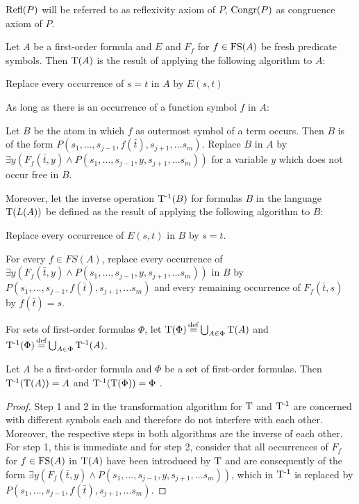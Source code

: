 $\operatorname{Refl}(P)$ will be referred to as reflexivity axiom of $P$, $\operatorname{Congr}(P)$ as congruence axiom of $P$.

\begin{defi}
	\label{def:trans}
	Let $A$ be a first-order formula and $E$ and $F_f$ for $f \in \operatorname{FS}(A)$ be fresh predicate symbols.
	Then $\operatorname{T}(A)$ is the result of applying the following algorithm to $A$:

	\begin{compactenum}
	\item Replace every occurrence of $s=t$ in $A$ by $E(s, t)$
	\label{def:trans_step1}
	\item As long as there is an occurrence of a function symbol $f$ in $A$:
	\label{def:trans_step2}

		Let $B$ be the atom in which $f$ as outermost symbol of a term occurs.
		Then $B$ is of the form $P(s_1, \ldots, s_{j-1}, f(\bar t),\allowbreak s_{j+1}, \ldots s_m)$.
		Replace $B$ in $A$ by $\exists y (F_f(\bar t, y) \land P(s_1, \ldots, s_{j-1}, y, s_{j+1}, \ldots s_m))$ for a variable $y$ which does not occur free in $B$.
	\end{compactenum}

	Moreover, let the inverse operation $\operatorname{T^{-1}}(B)$ for formulas $B$ in the language $\operatorname{T}(L(A))$ be defined as the result of applying the following algorithm to $B$:
	\begin{compactenum}
	\item Replace every occurrence of $E(s, t)$ in $B$ by $s=t$.
	\item For every $f \in FS(A)$, replace every occurrence of 
		$\exists y (F_f(\bar t, y) \land P(s_1, \ldots, s_{j-1},\allowbreak y,\allowbreak s_{j+1}, \ldots s_m))$
		in $B$ by $P(s_1, \ldots, s_{j-1},\allowbreak f(\bar t),\allowbreak s_{j+1}, \ldots s_m)$ and every remaining occurrence of $F_f(\bar t, s)$ by $f(\bar t) = s$.
	\end{compactenum}

	For sets of first-order formulas $\Phi$, let $\operatorname{T}(\Phi) \operatorname{\stackrel{\mathrm{def}}{=}} \bigcup_{A\in\Phi} \operatorname{T}(A)$ and 
$\operatorname{T^{-1}}(\Phi) \operatorname{\stackrel{\mathrm{def}}{=}} \bigcup_{A\in\Phi} \operatorname{T^{-1}}(A)$.
\end{defi}

\begin{lemma}
	\label{lemma:tinv}
	Let $A$ be a first-order formula and $\Phi$ be a set of first-order formulas.
	Then 
	$\operatorname{T^{-1}}(\operatorname{T}(A)) = A$
	and
	$\operatorname{T^{-1}}(\operatorname{T}(\Phi)) = \Phi$
	.
\end{lemma}
\begin{proof}
	Step 1 and 2 in the transformation algorithm for $\operatorname{T}$ and $\operatorname{T^{-1}}$ are concerned with different symbols each and therefore do not interfere with each other.
	Moreover, the respective steps in both algorithms are the inverse of each other.
	For step 1, this is immediate and for step 2, consider that all occurrences of $F_f$ for $f \in \operatorname{FS}(A)$ in $\operatorname{T}(A)$ have been introduced by $\operatorname{T}$ and are consequently of the form
	$\exists y (F_f(\bar t, y) \land P(s_1, \ldots, s_{j-1}, y, s_{j+1}, \ldots s_m))$, which in $\operatorname{T^{-1}}$ is replaced by 
$P(s_1, \ldots, s_{j-1},\allowbreak f(\bar t),\allowbreak s_{j+1}, \ldots s_m)$.
\end{proof}

